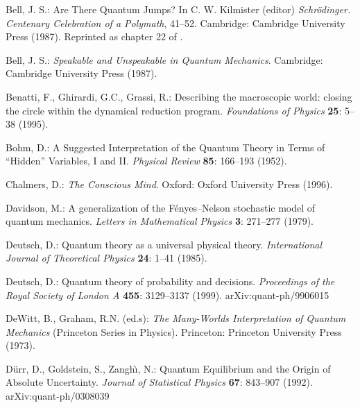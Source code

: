 \documentclass[12pt]{article}
\begin{document}
\begin{thebibliography}{29}
 Bell, J. S.: Are There Quantum Jumps? In C. W. Kilmister (editor)
  \textit{Schr\"odinger. Centenary Celebration of a Polymath}, 41--52. Cambridge:
  Cambridge University Press (1987). Reprinted as chapter 22 of
  \cite{Bell87b}.

 Bell, J. S.: \textit{Speakable and Unspeakable in
    Quantum Mechanics}. Cambridge: Cambridge University Press (1987).

 Benatti, F., Ghirardi, G.C., Grassi, R.: 
	Describing the macroscopic world: closing the circle within
	the dynamical reduction program.
	\textit{Foundations of Physics} \textbf{25}: 5--38 (1995).

 Bohm, D.: 
	A Suggested Interpretation of the Quantum
	Theory in Terms of ``Hidden'' Variables, I and II. 
	\textit{Physical Review} \textbf{85}: 166--193 (1952).

 Chalmers, D.:
	\textit{The Conscious Mind}. 
	Oxford: Oxford University Press (1996).

   Davidson, M.: A generalization of the
   F\'enyes--Nelson stochastic model of quantum mechanics.
   \textit{Letters in Mathematical Physics} \textbf{3}: 271--277 (1979).

  Deutsch, D.: 
	Quantum theory as a universal physical theory. 
	\textit{International Journal of Theoretical Physics} \textbf{24}: 1--41 (1985).

 Deutsch, D.: 
	Quantum theory of probability and decisions. 
	\textit{Proceedings of the Royal Society of London A} 
	\textbf{455}: 3129--3137 (1999). arXiv:quant-ph/9906015

 DeWitt, B., Graham, R.N. (ed.s): 
	\textit{The Many-Worlds Interpretation of Quantum Mechanics} 
	(Princeton Series in Physics).
	Princeton: Princeton University Press (1973).

 D\"urr, D., Goldstein, S., Zangh\`\i, N.: 
	Quantum Equilibrium and the Origin of Absolute Uncertainty. 
	\textit{Journal of Statistical Physics} \textbf{67}: 843--907 (1992). 
	arXiv:quant-ph/0308039
  



\end{thebibliography}
\end{document}
